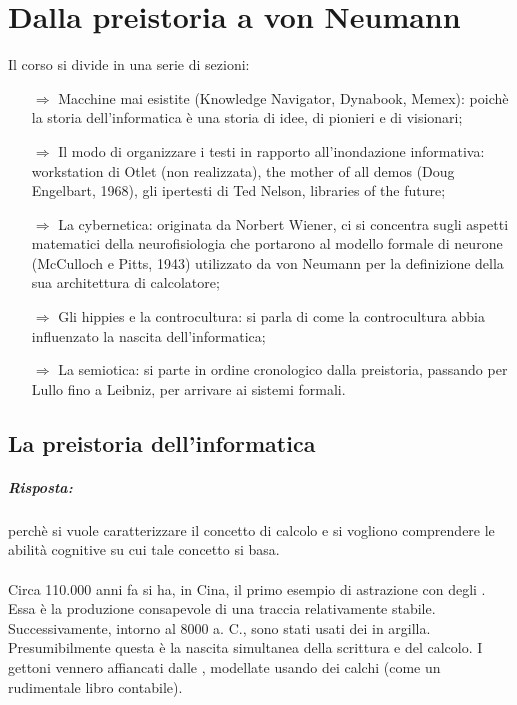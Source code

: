 \chapter{Dalla preistoria a von Neumann}

Il corso si divide in una serie di sezioni:
\begin{itemize}
    \item [$\Rightarrow$] Macchine mai esistite (Knowledge
    Navigator, Dynabook, Memex): poichè la storia dell'informatica
    è una storia di idee, di pionieri e di visionari;
    \item [$\Rightarrow$] Il modo di organizzare i testi in rapporto all'inondazione 
    informativa: workstation di Otlet (non realizzata), the mother of all
    demos (Doug Engelbart, 1968), gli ipertesti di Ted Nelson, libraries
    of the future;
    \item [$\Rightarrow$] La cybernetica: originata da Norbert Wiener, ci si concentra sugli
    aspetti matematici della neurofisiologia che portarono al modello formale di
    neurone (McCulloch e Pitts, 1943) utilizzato da von Neumann per la
    definizione della sua architettura di calcolatore;
    \item [$\Rightarrow$] Gli hippies e la controcultura: si parla di come la controcultura 
    abbia influenzato la nascita dell'informatica;
    \item [$\Rightarrow$] La semiotica: si parte in ordine cronologico dalla preistoria, passando per Lullo fino
    a Leibniz, per arrivare ai sistemi formali.
\end{itemize}

\section{La preistoria dell'informatica}


\paragraph{Risposta:} perchè si vuole caratterizzare il
concetto di calcolo e si vogliono comprendere le abilità cognitive
su cui tale concetto si basa.

\subsubsection{}

Circa 110.000 anni fa si ha, in Cina, il primo esempio di astrazione con degli . Essa è la produzione consapevole di una traccia relativamente stabile. Successivamente, intorno al 8000 a. C., sono stati usati dei  in argilla. Presumibilmente questa è la nascita simultanea della scrittura e del calcolo. I gettoni vennero affiancati dalle , modellate usando dei calchi (come un rudimentale libro contabile).

